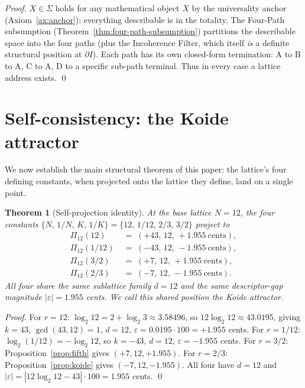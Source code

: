 \documentclass[11pt,a4paper]{article}
\newtheorem{theorem}{Theorem}[section]
\theoremstyle{definition}
\theoremstyle{remark}
\newcommand{\eps}{\varepsilon}
\begin{document}
\begin{proof}
$X \in \Sigma$ holds for any mathematical object $X$ by the universality anchor (Axiom~\ref{ax:anchor}): everything describable is in the totality. The Four-Path subsumption (Theorem~\ref{thm:four-path-subsumption}) partitions the describable space into the four paths (plus the Incoherence Filter, which itself \emph{is} a definite structural position at $\partial I$). Each path has its own closed-form termination: A to B to A, C to A, D to a specific sub-path terminal. Thus in every case a lattice address exists. \qed
\end{proof}


\section{Self-consistency: the Koide attractor}\label{sec:selfcons}

We now establish the main structural theorem of this paper: the lattice's four defining constants, when projected onto the lattice they define, land on a single point.

\begin{theorem}[Self-projection identity]\label{thm:self}
At the base lattice $N=12$, the four constants $\{N,\,1/N,\,K,\,1/K\}=\{12,\,1/12,\,2/3,\,3/2\}$ project to
\begin{align*}
\Pi_{12}(12) &\;=\; (+43,\,12,\,+1.955\ \mathrm{cents}),\\
\Pi_{12}(1/12) &\;=\; (-43,\,12,\,-1.955\ \mathrm{cents}),\\
\Pi_{12}(3/2) &\;=\; (+7,\,12,\,+1.955\ \mathrm{cents}),\\
\Pi_{12}(2/3) &\;=\; (-7,\,12,\,-1.955\ \mathrm{cents}).
\end{align*}
All four share the same sublattice family $d=12$ and the same descriptor-gap magnitude $|\eps|=1.955$ cents. We call this shared position the \emph{Koide attractor}.
\end{theorem}

\begin{proof}
For $r=12$: $\log_{2}12 = 2 + \log_{2}3 \approx 3.58496$, so $12\log_{2}12 \approx 43.0195$, giving $k=43$, $\gcd(43,12)=1$, $d=12$, $\eps = 0.0195\cdot 100 = +1.955$ cents. For $r=1/12$: $\log_{2}(1/12) = -\log_{2}12$, so $k=-43$, $d=12$, $\eps = -1.955$ cents. For $r=3/2$: Proposition~\ref{prop:fifth} gives $(+7,12,+1.955)$. For $r=2/3$: Proposition~\ref{prop:koide} gives $(-7,12,-1.955)$. All four have $d=12$ and $|\eps| = |12\log_{2}12 - 43|\cdot 100 = 1.955$ cents. \qed
\end{proof}
\end{document}
